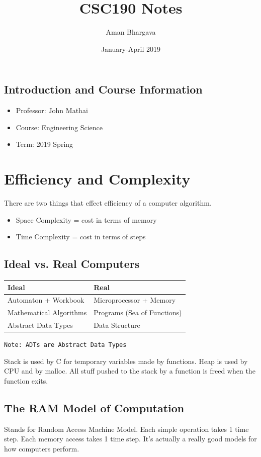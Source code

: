 \documentclass[a4paper,12pt]{report}
\begin{document}
\title{CSC190 Notes}
\author{Aman Bhargava}
\date{January-April 2019}
\maketitle

\tableofcontents

\section{Introduction and Course Information}
\begin{itemize}
\item Professor: John Mathai
\item Course: Engineering Science
\item Term: 2019 Spring
\end{itemize}

\chapter{Efficiency and Complexity}
There are two things that effect efficiency of a computer algorithm.
\begin{itemize}
\item Space Complexity = cost in terms of memory
\item Time Complexity = cost in terms of steps
\end{itemize}

\section{Ideal vs. Real Computers}
\begin{tabular}{l|l}
Ideal & Real \\
\hline
Automaton + Workbook & Microprocessor + Memory \\
Mathematical Algorithms & Programs (Sea of Functions) \\
Abstract Data Types & Data Structure 
\end{tabular}

\texttt{Note: ADTs are Abstract Data Types}

Stack is used by C for temporary variables made by functions. Heap is used by CPU and by malloc. All stuff pushed to the stack by a function is freed when the function exits. 

\section{The RAM Model of Computation}
Stands for Random Access Machine Model.
Each simple operation takes 1 time step. Each memory access takes 1 time step. It's actually a really good models for how computers perform.
\end{document}
